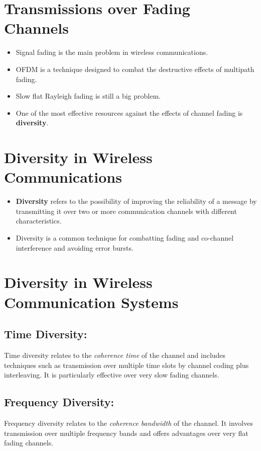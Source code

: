 \section*{Transmissions over Fading Channels}

\begin{itemize}
    \item Signal fading is the main problem in wireless communications.
    \item OFDM is a technique designed to combat the destructive effects of multipath fading.
    \item Slow flat Rayleigh fading is still a big problem.
    \item One of the most effective resources against the effects of channel fading is \textbf{diversity}.
\end{itemize}

\section*{Diversity in Wireless Communications}

\begin{itemize}
    \item \textbf{Diversity} refers to the possibility of improving the reliability of a message by transmitting it over two or more communication channels with different characteristics.
    \item Diversity is a common technique for combatting fading and co-channel interference and avoiding error bursts.
\end{itemize}


\section*{Diversity in Wireless Communication Systems}

\subsection*{Time Diversity:}
Time diversity relates to the \textit{coherence time} of the channel and includes techniques such as transmission over multiple time slots by channel coding plus interleaving. It is particularly effective over very slow fading channels.

\subsection*{Frequency Diversity:}
Frequency diversity relates to the \textit{coherence bandwidth} of the channel. It involves transmission over multiple frequency bands and offers advantages over very flat fading channels.

